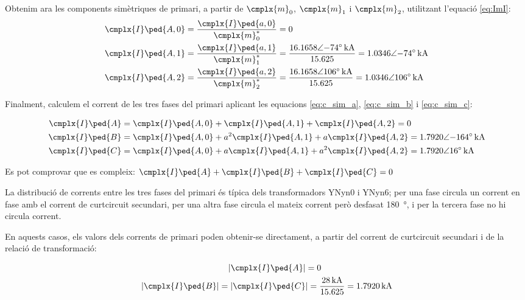 \begin{exemple}[\CCasimSecTrafo{}]
    Obtenim ara les components simètriques de primari, a partir de $\cmplx{m}_0$, $\cmplx{m}_1$ i $\cmplx{m}_2$, utilitzant l'equació \eqref{eq:ImI}:
    \begin{align*}
        \cmplx{I}\ped{A,0} &= \frac{\cmplx{I}\ped{a,0}}{\cmplx{m}^*_0} = 0 \\
        \cmplx{I}\ped{A,1} &= \frac{\cmplx{I}\ped{a,1}}{\cmplx{m}^*_1} = \frac{\complexqty{16,1658:-74}{kA}}{\num{15,625}} =  \complexqty{1,0346:-74}{kA} \\
        \cmplx{I}\ped{A,2} &= \frac{\cmplx{I}\ped{a,2}}{\cmplx{m}^*_2} = \frac{\complexqty{16,1658:106}{kA}}{\num{15,625}} = \complexqty{1,0346:106}{kA}
    \end{align*}

    Finalment, calculem el corrent de les tres fases del primari aplicant les equacions \eqref{eq:c_sim_a}, \eqref{eq:c_sim_b} i \eqref{eq:c_sim_c}:

     \begin{align*}
        \cmplx{I}\ped{A} &= \cmplx{I}\ped{A,0} + \cmplx{I}\ped{A,1} + \cmplx{I}\ped{A,2} = 0 \\
        \cmplx{I}\ped{B} &= \cmplx{I}\ped{A,0} + a^2 \cmplx{I}\ped{A,1} + a \cmplx{I}\ped{A,2} = \complexqty{1,7920:-164}{kA} \\
        \cmplx{I}\ped{C} &= \cmplx{I}\ped{A,0} + a \cmplx{I}\ped{A,1} + a^2 \cmplx{I}\ped{A,2} = \complexqty{1.7920:16}{kA}
    \end{align*}

    Es pot comprovar que es compleix: $\cmplx{I}\ped{A} + \cmplx{I}\ped{B} + \cmplx{I}\ped{C} = 0$

    La distribució de corrents entre les tres fases del primari és típica dels transformadors YNyn0 i YNyn6; per una fase circula un corrent en fase amb el corrent de curtcircuit secundari, per una altra fase circula el mateix corrent però desfasat \qty{180}{\degree}, i per la tercera fase no hi circula corrent.

    En aquests casos, els valors dels corrents de primari poden obtenir-se directament, a partir del corrent de curtcircuit secundari i de la relació de transformació:

    \begin{align*}
        |\cmplx{I}\ped{A}| &= 0 \\
        |\cmplx{I}\ped{B}| = |\cmplx{I}\ped{C} &|=  \frac{\qty{28}{kA}}{\num{15,625}} = \qty{1,7920}{kA}
    \end{align*}

\end{exemple}




